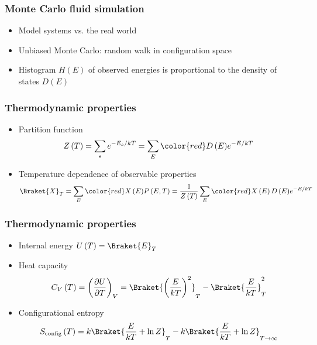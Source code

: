 \documentclass{beamer}
\newcommand{\f}[2]{\dfrac{#1}{#2}} %
\renewcommand{\d}{\partial} %
\newcommand{\p}[1]{\left(#1\right)} %
\newcommand{\bk}{\Braket} %
\let\olditem\item
\renewcommand{\item}{\setlength{\itemsep}{6pt}\olditem}
\begin{document}
\begin{frame}
  \frametitle{Monte Carlo fluid simulation}
  \begin{itemize}
  \item Model systems vs. the real world
  \item Unbiased Monte Carlo: random walk in configuration space
  \item Histogram $H\p{E}$ of observed energies is proportional to the
    density of states $D\p{E}$
  \end{itemize}
\end{frame}

\begin{frame}
  \frametitle{Thermodynamic properties}
  \begin{itemize}
  \item Partition function
    \begin{align*}
      Z\p{T}=\sum_se^{-E_s/kT}=\sum_E{\color{red}D\p{E}}e^{-E/kT}
    \end{align*}
  \item Temperature dependence of observable properties
    \begin{align*}
      \bk{X}_T=\sum_E{\color{red} X\p{E}}P\p{E,T}
      =\f1{Z\p{T}}\sum_E{\color{red}X\p{E}D\p{E}}e^{-E/kT}
    \end{align*}
  \end{itemize}
\end{frame}

\begin{frame}
  \frametitle{Thermodynamic properties}
  \begin{itemize}
  \item Internal energy $U\p{T}=\bk{E}_T$
  \item Heat capacity
    \begin{align*}
      C_V\p{T}=\p{\f{\d U}{\d T}}_V
      =\bk{\p{\f{E}{kT}}^2}_T-\bk{\f{E}{kT}}_T^2
    \end{align*}
  \item Configurational entropy
  \begin{align*}
    S_{\text{config}}\p{T} =k\bk{\f{E}{kT}+\ln Z}_T
    -k\bk{\f{E}{kT}+\ln Z}_{T\to\infty}
  \end{align*}

  \end{itemize}
\end{frame}
\end{document}
